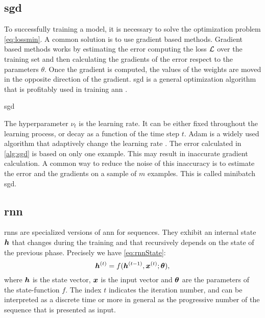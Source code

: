 \subsection{\acf{sgd}}
\label{sec:sgd}
To successfully training a model, it is necessary to solve the
optimization problem \eqref{eq:lossmin}. A common solution is to use
gradient based methods. Gradient based methods works by estimating the
error computing the loss $\mathcal{L}$ over the training set and then
calculating the 
gradients of the error respect to the parameters $\theta$. Once the
gradient is computed, the values of the weights are moved in the
opposite direction of the gradient. \acf{sgd} is a general
optimization algorithm that is profitably used in training \ac{ann}
\cite{bottou2012stochastic,lecun1995convolutional}.
\begin{algorithm}
  \caption{\acf{sgd}}\label{alg:sgd}
\end{algorithm}
The hyperparameter $\nu_t$ is the learning rate. It can be either
fixed throughout the learning process, or decay as a function of the
time step $t$. Adam is a widely used algorithm that adaptively change
the learning rate \cite{kingma2014adam}. The error calculated in
\cref{alg:sgd} is based on only one example. This may result in
inaccurate gradient calculation. A common way to reduce the noise of
this inaccuracy is to estimate the error and the gradients on a sample
of $m$ examples. This is called minibatch \ac{sgd}.

\subsection{\acf{rnn}}
\acp{rnn} are specialized versions of \ac{ann} for sequences. They
exhibit an
internal state $\bm{h}$ that changes during the training and that
recursively depends on the state of the previous phase. Precisely we
have \cref{eq:rnnState}:
\begin{equation}\label{eq:rnnState}
  \bm{h}^{(t)} = f(\bm{h}^{(t-1)}, \bm{x}^{(t)}; \bm{\theta}),
\end{equation}
where $\bm{h}$ is the state vector, $\bm{x}$ is the input vector
and $\bm{\theta}$ are the parameters of the state-function
$f$. The index $t$ indicates 
the iteration number, and can be interpreted as a discrete time or
more in general as the progressive number of the sequence that is
presented as
input.

